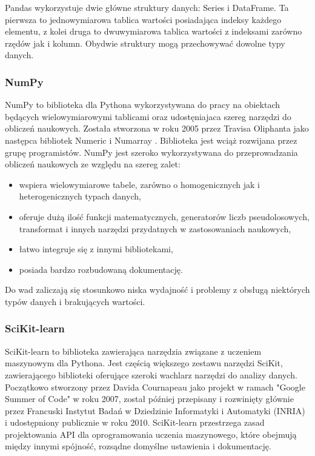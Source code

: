 \documentclass[12pt,twoside]{article}
\begin{document}
Pandas wykorzystuje dwie główne struktury danych: Series i DataFrame.
Ta pierwsza to jednowymiarowa tablica wartości posiadająca indeksy każdego elementu,
z kolei druga to dwuwymiarowa tablica wartości z indeksami zarówno rzędów jak i kolumn.
Obydwie struktury mogą przechowywać dowolne typy danych. \cite{pandas2}

\subsubsection{NumPy}

NumPy to biblioteka dla Pythona wykorzystywana do pracy na obiektach będących wielowymiarowymi tablicami
oraz udostęniajaca szereg narzędzi do obliczeń naukowych. Została stworzona w roku 2005 przez Travisa Oliphanta
jako następca bibliotek Numeric \cite{numeric} i Numarray \cite{numarray}. Biblioteka jest wciąż rozwijana przez grupę programistów.
NumPy jest szeroko wykorzystywana do przeprowadzania obliczeń naukowych ze względu na szereg zalet: \cite{numpy2}\cite{numpy3}

\begin{itemize}[label=-,labelsep=0.4cm, leftmargin=1.25cm]
    \item wspiera wielowymiarowe tabele, zarówno o homogenicznych jak i heterogenicznych typach danych,
    \item oferuje dużą ilość funkcji matematycznych, generatorów liczb pseudolosowych, transformat i innych narzędzi
          przydatnych w zastosowaniach naukowych,
    \item łatwo integruje się z innymi bibliotekami,
    \item posiada bardzo rozbudowaną dokumentację.
\end{itemize}

Do wad zaliczają się stosunkowo niska wydajność i problemy z obsługą niektórych typów danych i brakujących wartości. \cite{numpy3}

\subsubsection{SciKit-learn}

SciKit-learn to biblioteka zawierająca narzędzia związane z uczeniem maszynowym dla Pythona.
Jest częścią większego zestawu narzędzi SciKit,
zawierającego biblioteki oferujące szeroki wachlarz narzędzi do analizy danych.
Początkowo stworzony przez Davida Cournapeau jako projekt w ramach "Google Summer of Code" w roku 2007,
został później przepisany i rozwinięty głównie przez Francuski Instytut Badań w Dziedzinie Informatyki i Automatyki (INRIA)
i udostępniony publicznie w roku 2010.
SciKit-learn przestrzega zasad projektowania API dla oprogramowania uczenia maszynowego,
które obejmują między innymi spójność, rozsądne domyślne ustawienia i dokumentację. \cite{scikit}
\end{document}
